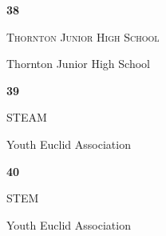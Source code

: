 \documentclass[extrafontsizes,30pt]{memoir}
\begin{document}
\begin{center}
\mbox{}
\vspace{1in}

{\Huge \textbf{ \TeamID}}

\vspace{1in}

{\Large \textsc{\TeamName}}

\vspace{1in}

{\large \SchoolName}
\end{center}

\newpage



\renewcommand{\TeamID}{38}
\renewcommand{\TeamName}{Thornton Junior High School}
\renewcommand{\SchoolName}{Thornton Junior High School}

\begin{center}
\mbox{}
\vspace{1in}

{\Huge \textbf{ \TeamID}}

\vspace{1in}

{\Large \textsc{\TeamName}}

\vspace{1in}

{\large \SchoolName}
\end{center}

\newpage



\renewcommand{\TeamID}{39}
\renewcommand{\TeamName}{STEAM}
\renewcommand{\SchoolName}{Youth Euclid Association}

\begin{center}
\mbox{}
\vspace{1in}

{\Huge \textbf{ \TeamID}}

\vspace{1in}

{\Large \textsc{\TeamName}}

\vspace{1in}

{\large \SchoolName}
\end{center}

\newpage



\renewcommand{\TeamID}{40}
\renewcommand{\TeamName}{STEM}
\renewcommand{\SchoolName}{Youth Euclid Association}

\begin{center}
\mbox{}
\vspace{1in}

{\Huge \textbf{ \TeamID}}

\vspace{1in}

{\Large \textsc{\TeamName}}

\vspace{1in}

{\large \SchoolName}
\end{center}
\end{document}
